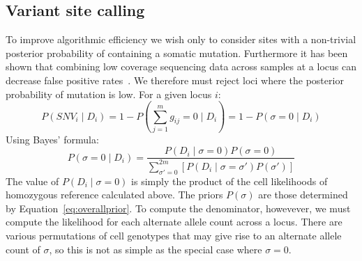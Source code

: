 \documentclass[../main.tex]{subfiles}
\begin{document}
\subsection{Variant site calling}
To improve algorithmic efficiency we wish only to consider sites with a non-trivial posterior probability of containing a somatic mutation. Furthermore it has been shown that combining low coverage sequencing data across samples at a locus can decrease false positive rates~\cite{ledurbin}. We therefore must reject loci where the posterior probability of mutation is low. For a given locus $i$:
\begin{equation}
P(SNV_i\mid D_i) = 1- P\left(\sum_{j=1}^m g_{ij} = 0 \mid D_i\right) = 1-P(\sigma = 0 \mid D_i)
\end{equation}
Using Bayes' formula:
\begin{equation}\label{eq:sitebayes}
P\left(\sigma = 0 \mid D_i\right) = \frac{P(D_i\mid \sigma = 0)P(\sigma = 0)}{\sum_{\sigma'=0}^{2m}[P(D_i\mid \sigma=\sigma')P(\sigma')]}
\end{equation}
The value of $P(D_i\mid \sigma = 0)$ is simply the product of the cell likelihoods of homozygous reference calculated above. The priors $P(\sigma)$ are those determined by Equation~\eqref{eq:overallprior}. To compute the denominator, howevever, we must compute the likelihood for each alternate allele count across a locus. There are various permutations of cell genotypes that may give rise to an alternate allele count of $\sigma$, so this is not as simple as the special case where $\sigma=0$.\\
\end{document}
